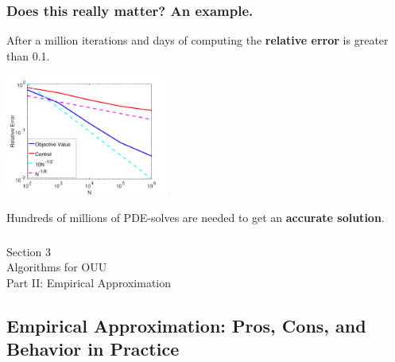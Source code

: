 \documentclass[aspectratio=169,xcolor=dvipsnames,10pt]{beamer}
\begin{document}
\begin{frame}\frametitle{Does this really matter? An example.}
\begin{exampleblock}{}\centering
After a \alert{million} iterations and \alert{days of computing} the \textbf{relative error} is \alert{greater than 0.1}.
\end{exampleblock}
\begin{center}
\includegraphics[width=0.4\textwidth,keepaspectratio]{Part I/figures/error.pdf}
\end{center}
\begin{exampleblock}{}\centering
\alert{Hundreds of millions} of \alert{PDE-solves} are needed to get an \textbf{accurate solution}.
\end{exampleblock}
\end{frame}



\begin{frame}\frametitle{}
\begin{center}\Large
Section 3\\
Algorithms for OUU\\
Part II: Empirical Approximation
\end{center}
\end{frame}


\subsection{Empirical Approximation: Pros, Cons, and Behavior in Practice} 
\end{document}

